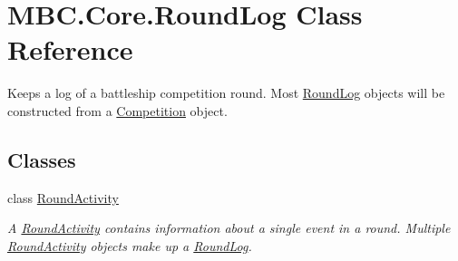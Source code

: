 \hypertarget{class_m_b_c_1_1_core_1_1_round_log}{\section{M\-B\-C.\-Core.\-Round\-Log Class Reference}
\label{class_m_b_c_1_1_core_1_1_round_log}
}


Keeps a log of a battleship competition round. Most \hyperlink{class_m_b_c_1_1_core_1_1_round_log}{Round\-Log} objects will be constructed from a \hyperlink{class_m_b_c_1_1_core_1_1_competition}{Competition} object.  


\subsection*{Classes}
\begin{DoxyCompactItemize}
\item 
class \hyperlink{class_m_b_c_1_1_core_1_1_round_log_1_1_round_activity}{Round\-Activity}
\begin{DoxyCompactList}\small\item\em A \hyperlink{class_m_b_c_1_1_core_1_1_round_log_1_1_round_activity}{Round\-Activity} contains information about a single event in a round. Multiple \hyperlink{class_m_b_c_1_1_core_1_1_round_log_1_1_round_activity}{Round\-Activity} objects make up a \hyperlink{class_m_b_c_1_1_core_1_1_round_log}{Round\-Log}. \end{DoxyCompactList}\end{DoxyCompactItemize}
